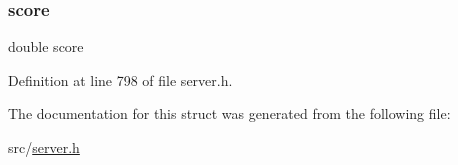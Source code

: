 \mbox{\label{structzskiplist_node_a40a24ec85daa9ac70aa74e4ca744f838}} 
\subsubsection{\texorpdfstring{score}{score}}
{\footnotesize\ttfamily double score}



Definition at line 798 of file server.\+h.



The documentation for this struct was generated from the following file\+:\begin{DoxyCompactItemize}
\item 
src/\hyperlink{server_8h}{server.\+h}\end{DoxyCompactItemize}
